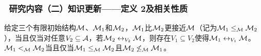 \documentclass[aspectratio=1610, 9pt, CJK]{beamer}
\begin{document}
\begin{frame}
	\frametitle{~研究内容（二）知识更新——{\footnotesize 定义 2及相关性质}}
	{\footnotesize
		\begin{definition}\label{def:closer}
			给定三个有限初始结构${\cal M}$、${\cal M}_1$和${\cal M}_2$，${\cal M}_1$比${\cal M}_2$更接近${\cal M}$（记为${\cal M}_1 \leq_{{\cal M}} {\cal M}_2$），当且仅当对任意$V_2 \subseteq {\cal A}$，若${\cal M}_2 \leftrightarrow_{V_2} {\cal M}$，则存在$V_1 \subseteq V_2$使得${\cal M}_1 \leftrightarrow_{V_1} {\cal M}$。
			${\cal M}_1 <_{{\cal M}} {\cal M}_2$当且仅当${\cal M}_1 \leq_{{\cal M}} {\cal M}_2$且${\cal M}_2 \not \leq_{{\cal M}} {\cal M}_1$。
		\end{definition}
		
		}
\end{frame}
\end{document}
